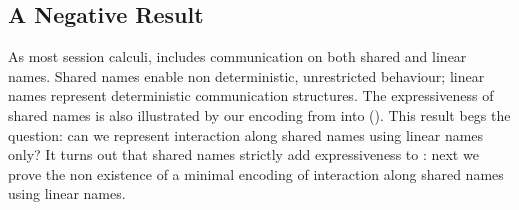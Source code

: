 \documentclass[preprint,11pt]{elsarticle}
\begin{document}
{{%
%
%



\subsection{A Negative Result}
\label{ss:negative}
%

As most session calculi, 
\HOp includes communication on both shared and linear names.
Shared names enable non deterministic, unrestricted behaviour; 
linear names represent deterministic communication structures.
The expressiveness of shared names is also illustrated by our 
encoding from \HOp into \sessp ().
This result begs the question: 
can we represent  interaction along shared names using linear names only?
It turns out that shared names strictly add expressiveness to \HOp:
next we prove
the non existence of a minimal encoding 
of interaction along shared names 
using linear names. %

}}
\end{document}
